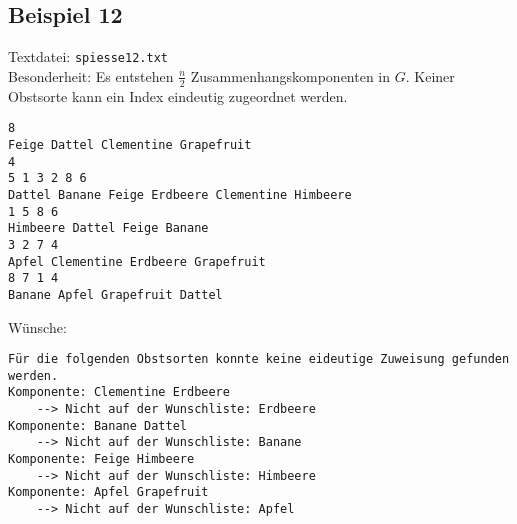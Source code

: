 \newpage
\subsection{Beispiel 12}\label{example:12}
Textdatei: \texttt{spiesse12.txt}\\
Besonderheit: Es entstehen $\frac{n}{2}$ Zusammenhangskomponenten in $G$. Keiner Obstsorte kann ein Index eindeutig zugeordnet werden.
\begin{verbatim}
8
Feige Dattel Clementine Grapefruit
4
5 1 3 2 8 6
Dattel Banane Feige Erdbeere Clementine Himbeere
1 5 8 6
Himbeere Dattel Feige Banane
3 2 7 4
Apfel Clementine Erdbeere Grapefruit
8 7 1 4
Banane Apfel Grapefruit Dattel
\end{verbatim}

\noindent
Wünsche: \\

\noindent
{}
\begin{verbatim}
Für die folgenden Obstsorten konnte keine eideutige Zuweisung gefunden werden.
Komponente: Clementine Erdbeere 
	--> Nicht auf der Wunschliste: Erdbeere 
Komponente: Banane Dattel 
	--> Nicht auf der Wunschliste: Banane 
Komponente: Feige Himbeere 
	--> Nicht auf der Wunschliste: Himbeere 
Komponente: Apfel Grapefruit 
	--> Nicht auf der Wunschliste: Apfel
\end{verbatim}